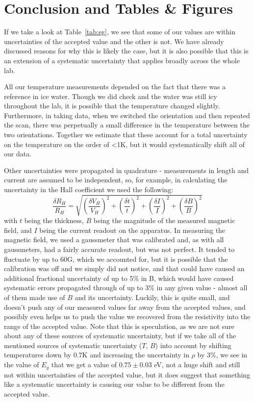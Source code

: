 \documentclass[reprint, nobibnotes, amssymb, amsmath, amsfonts, physics, mathtools, mathrsfs, floatfix]{revtex4-1}
\begin{document}
    \section{Conclusion and Tables \& Figures}
    If we take a look at Table~\ref{tab:eg}, we see that some of our values are within uncertainties of the accepted value and the other is not.  We have already discussed reasons for why this is likely the case, but it is also possible that this is an extension of a systematic uncertainty that applies broadly across the whole lab.

    All our temperature measurements depended on the fact that there was a reference in ice water.  Though we did check and the water was still icy throughout the lab, it is possible that the temperature changed slightly.  Furthermore, in taking data, when we switched the orientation and then repeated the scan, there was perpetually a small difference in the temperature between the two orientations.  Together we estimate that these account for a total uncertainty on the temperature on the order of <1K, but it would systematically shift all of our data.

    Other uncertainties were propagated in quadrature - measurements in length and current are assumed to be independent, so, for example, in calculating the uncertainty in the Hall coefficient we used the following:
    \begin{equation}
      \frac{\delta R_H}{R_H} = \sqrt{ \left(\frac{\delta V_H}{V_H}\right)^2 + \left(\frac{\delta t}{t}\right)^2 + \left(\frac{\delta I}{I}\right)^2 + \left(\frac{\delta B}{B}\right)^2 }
    \end{equation}
    with $t$ being the thickness, $B$ being the magnitude of the measured magnetic field, and $I$ being the current readout on the apparatus.  In measuring the magnetic field, we used a gaussmeter that was calibrated and, as with all gaussmeters, had a fairly accurate readout, but was not perfect.  It tended to fluctuate by up to 60G, which we accounted for, but it is possible that the calibration was off and we simply did not notice, and that could have caused an additional fractional uncertainty of up to 5\% in B, which would have caused systematic errors propagated through of up to 3\% in any given value - almost all of them made use of $B$ and its uncertainty.  Luckily, this is quite small, and doesn't push any of our measured values far away from the accepted values, and possibly even helps us to push the value we recovered from the resistivity into the range of the accepted value.  Note that this is speculation, as we are not sure about any of these sources of systematic uncertainty, but if we take all of the mentioned sources of systematic uncertainty ($T$, $B$) into account by shifting temperatures down by 0.7K and increasing the uncertainty in $\rho$ by 3\%, we see in the value of $E_g$ that we get a value of $0.75\pm0.03$ eV, not a huge shift and still not within uncertainties of the accepted value, but it does suggest that something like a systematic uncertainty is causing our value to be different from the accepted value.
\end{document}
